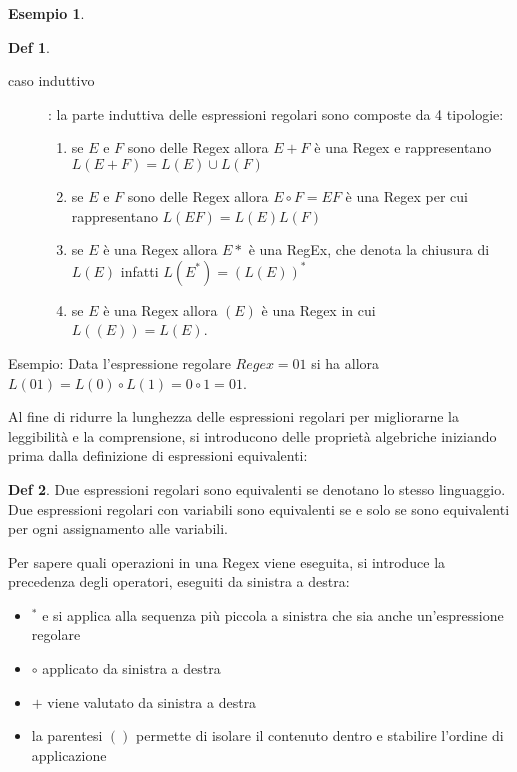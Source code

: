 \documentclass[a4paper]{book}
\theoremstyle{definition}%
\newtheorem*{defi}{Def}%
\newtheorem*{esempio}{Esempio}
\begin{document}
\begin{esempio}
\begin{defi}
\begin{description}
   \item [caso induttivo]: la parte induttiva delle espressioni regolari sono composte da 4 tipologie:
        \begin{enumerate}
        \item se $E$ e $F$ sono delle Regex allora $E + F$ è una Regex e rappresentano $L(E + F) = L(E) \cup L(F)$
        \item se $E$ e $F$ sono delle Regex allora $E \circ F = EF$ è una Regex per cui rappresentano $L(EF) = L(E)L(F)$
        \item se $E$ è una Regex allora $E*$ è una RegEx, che denota la chiusura di $L(E)$ infatti $L(E^*) = (L(E))^*$
        \item se $E$ è una Regex allora $(E)$ è una Regex in cui $L((E)) = L(E)$.
        \end{enumerate}
  \end{description}
\end{defi}

Esempio: Data l'espressione regolare $Regex = 01$ si ha allora $L(01) = L(0) \circ L(1) = 0 \circ 1 = 01$.

Al fine di ridurre la lunghezza delle espressioni regolari per migliorarne la leggibilità e la comprensione, si introducono
delle proprietà algebriche iniziando prima dalla definizione di espressioni equivalenti:
\begin{defi}
  Due espressioni regolari sono equivalenti se denotano lo stesso linguaggio.
  Due espressioni regolari con variabili sono equivalenti se e solo se sono equivalenti per ogni assignamento alle variabili.
\end{defi}
Per sapere quali operazioni in una Regex viene eseguita, si introduce la precedenza degli operatori, eseguiti da sinistra a destra:
\begin{itemize}
  \item $^*$ e si applica alla sequenza più piccola a sinistra che sia anche un'espressione regolare
  \item $\circ$  applicato da sinistra a destra
  \item $+$  viene valutato da sinistra a destra
  \item la parentesi $( )$ permette di isolare il contenuto dentro e stabilire l'ordine di applicazione
\end{itemize}


\end{esempio}
\end{document}
